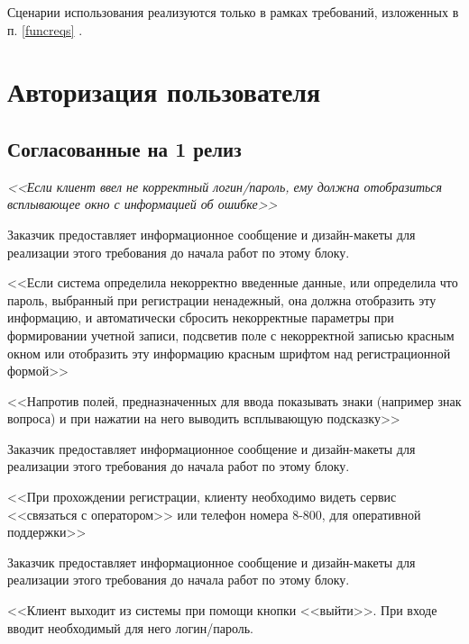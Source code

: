 Сценарии использования реализуются только в рамках требований, изложенных в п. \ref{funcreqs} .

\section{Авторизация пользователя}
\ifcand
\subsection{Согласованные на 1 релиз}
\fi
{}
{
\textit{<<Если клиент ввел не корректный логин/пароль, ему должна отобразиться всплывающее окно с информацией об ошибке>>}

Заказчик предоставляет информационное сообщение и дизайн-макеты для реализации этого требования до начала работ по этому блоку. 
}
{
<<Если система определила некорректно введенные данные, или определила что пароль, выбранный при регистрации ненадежный, она должна отобразить эту информацию, и автоматически сбросить некорректные параметры при формировании учетной записи, подсветив поле с некорректной записью красным окном или отобразить эту информацию красным шрифтом над регистрационной формой>> 
}
{
<<Напротив полей, предназначенных для ввода показывать знаки (например знак вопроса) и при нажатии на него выводить всплывающую подсказку>>

Заказчик предоставляет информационное сообщение и дизайн-макеты для реализации этого требования до начала работ по этому блоку. 
}
{
<<При прохождении регистрации, клиенту необходимо видеть сервис <<связаться с оператором>> или телефон номера 8-800, для оперативной поддержки>>

Заказчик предоставляет информационное сообщение и дизайн-макеты для реализации этого требования до начала работ по этому блоку. 
}
{
<<Клиент выходит из системы при помощи кнопки <<выйти>>. При входе вводит необходимый для него логин/пароль.  
}



